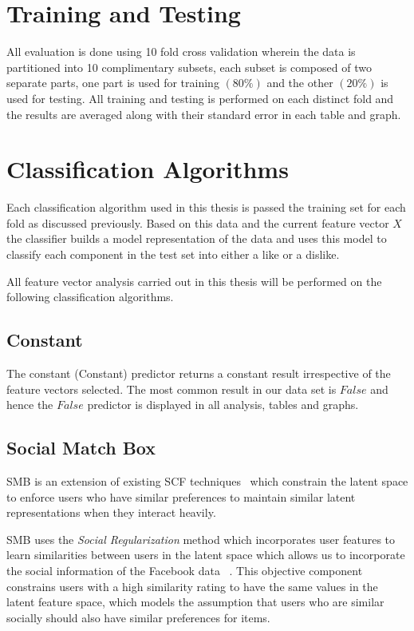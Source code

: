 \section{Training and Testing}
\label{sec:tt}

All evaluation is done using 10 fold cross validation wherein the data is partitioned into 10 complimentary subsets, each 
subset is composed of two separate parts, one part is used for training $(80\%)$ and the other $(20\%)$ is used for testing. 
All training and testing is performed on each distinct fold and the results are averaged along with their standard error in each
table and graph.

\section{Classification Algorithms}
\label{sec:meth}

Each classification algorithm used in this thesis is passed the training set for each fold as discussed previously. Based on this 
data and the current feature vector $X$ the classifier builds a model representation of the data and uses this model to classify 
each component in the test set into either a like or a dislike.

All feature vector analysis carried out in this thesis will be performed on the following classification algorithms.

\subsection{Constant}
\label{sec:const}

The constant (Constant) predictor returns a constant result irrespective of the feature vectors selected. The most common result 
in our data set is $False$ and hence the $False$ predictor is displayed in all analysis, tables and graphs.

\subsection{Social Match Box}
\label{sec:sr}

SMB is an extension of existing SCF techniques~\cite{lla,socinf} which constrain the latent space to enforce users 
who have similar preferences to maintain similar latent representations when they interact heavily.

SMB uses the \emph{Social Regularization} method which incorporates user features to learn
similarities between users in the latent space which allows us to incorporate the social information of the Facebook data ~\cite{joseph}.
This objective component constrains users with a high similarity rating to have the same values in the latent feature space, which
models the assumption that users who are similar socially should also have similar preferences for items.

